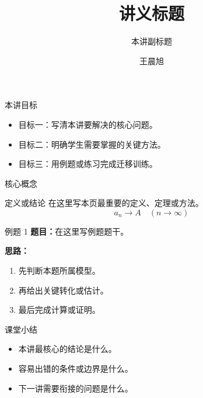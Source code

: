 \documentclass[aspectratio=169,11pt]{ctexbeamer}
\title{讲义标题}
\subtitle{本讲副标题}
\author{王晨旭}
\date{}
\begin{document}
\begin{frame}
  \titlepage
\end{frame}

\begin{frame}{本讲目标}
\begin{itemize}
  \item 目标一：写清本讲要解决的核心问题。
  \item 目标二：明确学生需要掌握的关键方法。
  \item 目标三：用例题或练习完成迁移训练。
\end{itemize}
\end{frame}

\begin{frame}{核心概念}
\begin{block}{定义或结论}
在这里写本页最重要的定义、定理或方法。
\[
  a_n \to A \quad (n\to\infty)
\]
\end{block}
\end{frame}

\begin{frame}{例题 1}
\textbf{题目：}在这里写例题题干。

\vspace{0.8em}
\textbf{思路：}
\begin{enumerate}
  \item 先判断本题所属模型。
  \item 再给出关键转化或估计。
  \item 最后完成计算或证明。
\end{enumerate}
\end{frame}

\begin{frame}{课堂小结}
\begin{itemize}
  \item 本讲最核心的结论是什么。
  \item 容易出错的条件或边界是什么。
  \item 下一讲需要衔接的问题是什么。
\end{itemize}
\end{frame}
\end{document}
